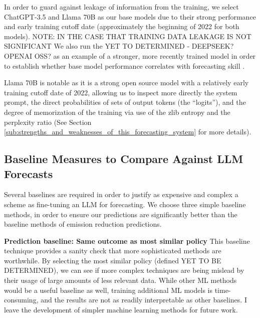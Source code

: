 \documentclass[12pt,a4paper]{article}
\begin{document}
In order to guard against leakage of information from the training, we select ChatGPT-3.5 and Llama 70B  as our base models due to their strong performance and early training cutoff date (approximately the beginning of 2022 for both models). NOTE: IN THE CASE THAT TRAINING DATA LEAKAGE IS NOT SIGNIFICANT We also run the YET TO DETERMINED - DEEPSEEK? OPENAI OSS? as an example of a stronger, more recently trained model in order to establish whether base model performance correlates with forecasting skill \ABSTRACT. 

Llama 70B is notable as it is a strong open source model with a relatively early training cutoff date of 2022, allowing us to inspect more directly the system prompt, the direct probabilities of sets of output tokens (the ``logits''), and the degree of memorization of the training via use of the zlib entropy and the perplexity ratio (See Section \ref{sub:strengths_and_weaknesses_of_this_forecasting_system} for more details).

\subsection{Baseline Measures to Compare Against LLM Forecasts}
Several baselines are required in order to justify as expensive and complex a scheme as fine-tuning an LLM for forecasting. We choose three simple baseline methods, in order to ensure our predictions are significantly better than the baseline methods of emission reduction predictions.

\textbf{Prediction baseline: Same outcome as most similar policy}
This baseline technique provides a sanity check that more sophisticated methods are worthwhile. By selecting the most similar policy (defined YET TO BE DETERMINED), we can see if more complex techniques are being mislead by their usage of large amounts of less relevant data. While other ML methods would be a useful baseline as well, training additional ML models is time-consuming, and the results are not as readily interpretable as other baselines. I leave the development of simpler machine learning methods for future work.

\end{document}
